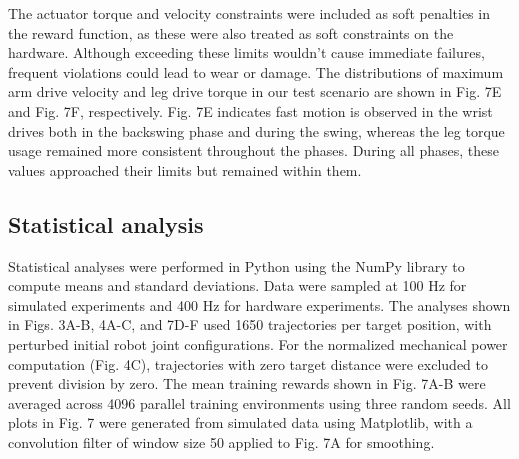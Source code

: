 \documentclass[9pt,twocolumn,twoside]{osajnl}
\begin{document}
The actuator torque and velocity constraints were included as soft penalties in the reward function, as these were also treated as soft constraints on the hardware. Although exceeding these limits wouldn't cause immediate failures, frequent violations could lead to wear or damage. The distributions of maximum arm drive velocity and leg drive torque in our test scenario are shown in Fig. 7E and Fig. 7F, respectively. Fig. 7E indicates fast motion is observed in the wrist drives both in the backswing phase and during the swing, whereas the leg torque usage remained more consistent throughout the phases. During all phases, these values approached their limits but remained within them.

\subsection*{Statistical analysis}
Statistical analyses were performed in Python using the NumPy library to compute means and standard deviations. Data were sampled at 100 Hz for simulated experiments and 400 Hz for hardware experiments. The analyses shown in Figs. 3A-B, 4A-C, and 7D-F used 1650 trajectories per target position, with perturbed initial robot joint configurations. For the normalized mechanical power computation (Fig. 4C), trajectories with zero target distance were excluded to prevent division by zero. The mean training rewards shown in Fig. 7A-B were averaged across 4096 parallel training environments using three random seeds. All plots in Fig. 7 were generated from simulated data using Matplotlib, with a convolution filter of window size 50 applied to Fig. 7A for smoothing.
\end{document}
